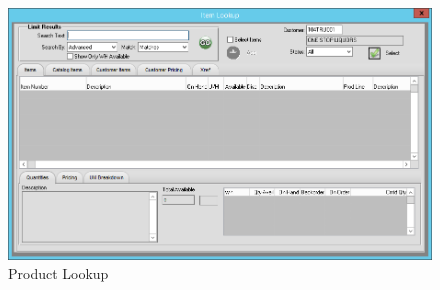 \begin{enumerate}
	\begin{figure}[H]
		\includegraphics[width=\textwidth]{../img/image94}
		\caption{Product Lookup}
	\end{figure}	
	

\end{enumerate}
